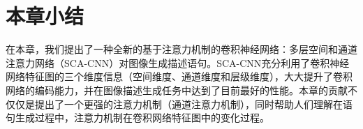 \section{本章小结}

在本章，我们提出了一种全新的基于注意力机制的卷积神经网络：多层空间和通道注意力网络（SCA-CNN）对图像生成描述语句。SCA-CNN充分利用了卷积神经网络特征图的三个维度信息（空间维度、通道维度和层级维度），大大提升了卷积网络的编码能力，并在图像描述生成任务中达到了目前最好的性能。本章的贡献不仅仅是提出了一个更强的注意力机制（通道注意力机制），同时帮助人们理解在语句生成过程中，注意力机制在卷积网络特征图中的变化过程。